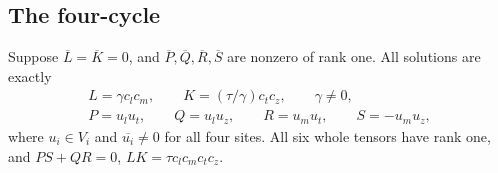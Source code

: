 \subsection{The four-cycle}

\begin{proposition}\label{atlas:cycle}
Suppose \(\overline L=\overline K=0\), and
\(\overline P,\overline Q,\overline R,\overline S\) are nonzero of rank one.
All solutions are exactly
\begin{equation}\label{atlas:cycle-form}
 \begin{gathered}
 L=\gamma c_lc_m,\qquad K=(\tau/\gamma)c_tc_z,\qquad\gamma\ne0,\\
 P=u_lu_t,\qquad Q=u_lu_z,\qquad
 R=u_mu_t,\qquad S=-u_mu_z,
 \end{gathered}
\end{equation}
where \(u_i\in V_i\) and \(\overline{u_i}\ne0\) for all four sites.
All six whole tensors have rank one, and
\(PS+QR=0\), \(LK=\tau c_lc_mc_tc_z\).
\end{proposition}

